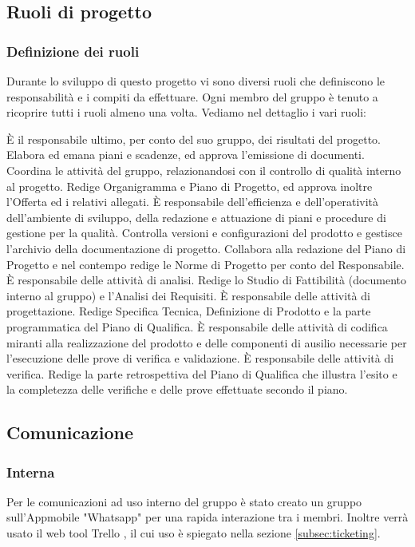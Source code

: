 \documentclass[a4paper,11pt]{article}
\begin{document}
		
		\subsection{Ruoli di progetto}
				\subsubsection{Definizione dei ruoli}
		Durante lo sviluppo di questo progetto vi sono diversi ruoli che  definiscono le responsabilità e i compiti da effettuare. Ogni membro del gruppo è tenuto a ricoprire tutti i ruoli almeno una volta. Vediamo nel dettaglio i vari ruoli:
		
		È il responsabile ultimo, per conto del suo gruppo, dei risultati del progetto.
Elabora ed emana piani e scadenze, ed approva l'emissione di documenti. 
Coordina le attività del gruppo, relazionandosi con il controllo di qualità interno al progetto. 
Redige Organigramma e Piano di Progetto, ed approva inoltre l'Offerta ed i relativi allegati.
			È responsabile dell'efficienza e dell'operatività dell'ambiente di sviluppo, della redazione e attuazione di piani e procedure di gestione per la qualità.
Controlla versioni e configurazioni del prodotto e gestisce l'archivio della documentazione di progetto. 
Collabora alla redazione del Piano di Progetto e nel contempo redige le Norme di Progetto per conto del Responsabile.
			È responsabile delle attività di analisi. 
Redige lo Studio di Fattibilità (documento interno al gruppo) e l'Analisi dei Requisiti.
			È responsabile delle attività di progettazione. 
Redige Specifica Tecnica, Definizione di Prodotto e la parte programmatica del Piano di Qualifica.
			È responsabile delle attività di codifica miranti alla realizzazione del prodotto e delle componenti di ausilio necessarie per l'esecuzione delle prove di verifica e validazione.
			È responsabile delle attività di verifica.
Redige la parte retrospettiva del Piano di Qualifica che illustra l'esito e la completezza delle verifiche e delle prove effettuate secondo il piano.
		
				
		
		\subsection{Comunicazione}
			\subsubsection{Interna}			
			Per le comunicazioni ad uso interno del gruppo è stato creato un gruppo sull'App\addglos mobile "Whatsapp" per una rapida interazione tra i membri. Inoltre verrà usato il web tool Trello \addglos, il cui uso è spiegato nella sezione \ref{subsec:ticketing}.
\end{document}
